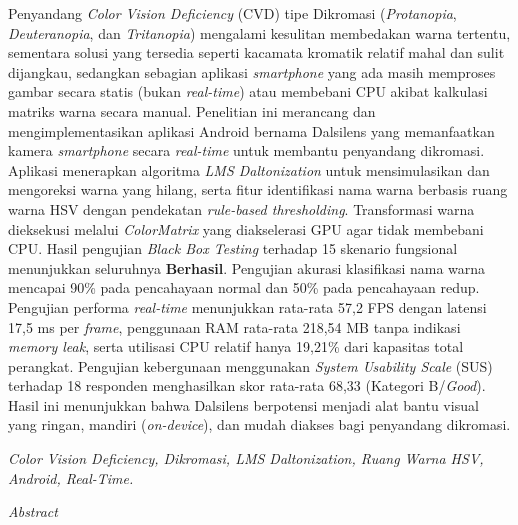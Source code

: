 \noindent\fontsize{10}{12}\selectfont
Penyandang \textit{Color Vision Deficiency} (CVD) tipe Dikromasi (\textit{Protanopia}, \textit{Deuteranopia}, dan \textit{Tritanopia}) mengalami kesulitan membedakan warna tertentu, sementara solusi yang tersedia seperti kacamata kromatik relatif mahal dan sulit dijangkau, sedangkan sebagian aplikasi \textit{smartphone} yang ada masih memproses gambar secara statis (bukan \textit{real-time}) atau membebani CPU akibat kalkulasi matriks warna secara manual. Penelitian ini merancang dan mengimplementasikan aplikasi Android bernama Dalsilens yang memanfaatkan kamera \textit{smartphone} secara \textit{real-time} untuk membantu penyandang dikromasi. Aplikasi menerapkan algoritma \textit{LMS Daltonization} untuk mensimulasikan dan mengoreksi warna yang hilang, serta fitur identifikasi nama warna berbasis ruang warna HSV dengan pendekatan \textit{rule-based thresholding}. Transformasi warna dieksekusi melalui \textit{ColorMatrix} yang diakselerasi GPU agar tidak membebani CPU. Hasil pengujian \textit{Black Box Testing} terhadap 15 skenario fungsional menunjukkan seluruhnya \textbf{Berhasil}. Pengujian akurasi klasifikasi nama warna mencapai 90\% pada pencahayaan normal dan 50\% pada pencahayaan redup. Pengujian performa \textit{real-time} menunjukkan rata-rata 57,2 FPS dengan latensi 17,5 ms per \textit{frame}, penggunaan RAM rata-rata 218,54 MB tanpa indikasi \textit{memory leak}, serta utilisasi CPU relatif hanya 19,21\% dari kapasitas total perangkat. Pengujian kebergunaan menggunakan \textit{System Usability Scale} (SUS) terhadap 18 responden menghasilkan skor rata-rata 68,33 (Kategori B/\textit{Good}). Hasil ini menunjukkan bahwa Dalsilens berpotensi menjadi alat bantu visual yang ringan, mandiri (\textit{on-device}), dan mudah diakses bagi penyandang dikromasi.

\vspace{0.6em}
 \textit{\fontsize{10}{12}\selectfont Color Vision Deficiency, Dikromasi, LMS Daltonization, Ruang Warna HSV, Android, Real-Time.}

\vspace{0.8em}
\begin{center}
  {\itshape\fontsize{12}{14}\selectfont Abstract}
\end{center}

